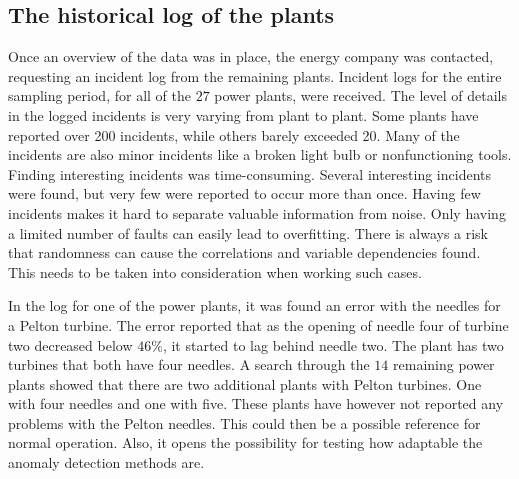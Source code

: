     \subsection{The historical log of the plants }
        Once an overview of the data was in place, the energy company was contacted, requesting an incident log from the remaining plants. Incident logs for the entire sampling period, for all of the $27$ power plants, were received. The level of details in the logged incidents is very varying from plant to plant. Some plants have reported over 200 incidents, while others barely exceeded 20. Many of the incidents are also minor incidents like a broken light bulb or nonfunctioning tools. Finding interesting incidents was time-consuming. Several interesting incidents were found, but very few were reported to occur more than once. Having few incidents makes it hard to separate valuable information from noise. Only having a limited number of faults can easily lead to overfitting. There is always a risk that randomness can cause the correlations and variable dependencies found. This needs to be taken into consideration when working such cases.  
        
        In the log for one of the power plants, it was found an error with the needles for a Pelton turbine. The error reported that as the opening of needle four of turbine two decreased below $46\%$, it started to lag behind needle two. The plant has two turbines that both have four needles. A search through the $14$ remaining power plants showed that there are two additional plants with Pelton turbines. One with four needles and one with five. These plants have however not reported any problems with the Pelton needles. This could then be a possible reference for normal operation. Also, it opens the possibility for testing how adaptable the anomaly detection methods are. 
        
        

